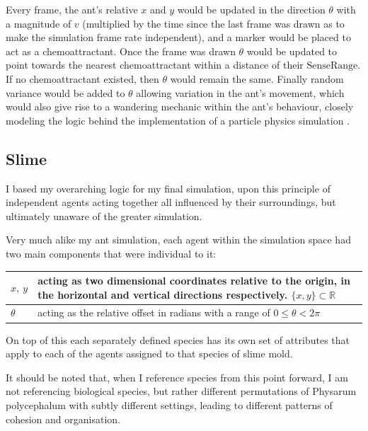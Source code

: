 \documentclass[]{report}
\begin{document}
Every frame, the ant’s relative $x$ and $y$ would be updated in the direction $\theta$ with a magnitude of $v$ (multiplied by the time since the last frame was drawn as to make the simulation frame rate independent), and a marker would be placed to act as a chemoattractant. Once the frame was drawn $\theta$ would be updated to point towards the nearest chemoattractant within a distance of their $\mathrm{SenseRange}$. If no chemoattractant existed, then $\theta$ would remain the same. Finally random variance would be added to $\theta$ allowing variation in the ant’s movement, which would also give rise to a wandering mechanic within the ant’s behaviour, closely modeling the logic behind the implementation of a particle physics simulation \cite{artificial_life_lab_graz_how_2016}.

\subsection{Slime}

I based my overarching logic for my final simulation, upon this principle of independent agents acting together all influenced by their surroundings, but ultimately unaware of the greater simulation.

Very much alike my ant simulation, each agent within the simulation space had two main components that were individual to it:

\begin{center}
\begin{tabular}{ | m{6em} | m{7cm}| } 
  \hline
  $x,\: y$ & acting as two dimensional coordinates relative to the origin, in the horizontal and vertical directions respectively. $\{x,y\} \subset \mathbb{R}$\\
  \hline
  $\theta$ & acting as the relative offset in radians with a range of $0 \leq\theta<2\pi$ \\ 
  \hline
\end{tabular}
\end{center}

On top of this each separately defined species has its own set of attributes that apply to each of the agents assigned to that species of slime mold.

It should be noted that, when I reference species from this point forward, I am not referencing biological species, but rather different permutations of \Gls{Physarum polycephalum} with subtly different settings, leading to different patterns of cohesion and organisation.
\end{document}
